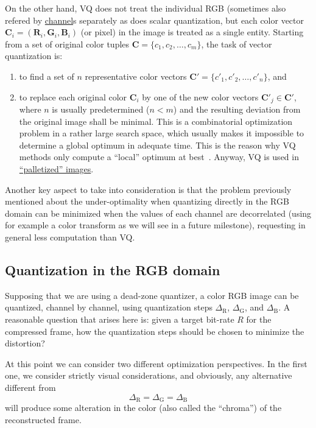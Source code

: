 On the other hand, VQ does not treat the individual RGB (sometimes
also refered by
\href{https://en.wikipedia.org/wiki/Color_image}{channel}s separately
as does scalar quantization, but each color vector
${\mathbf C}_i = ({\mathbf R}_i, {\mathbf G}_i, {\mathbf B}_i )$ (or
pixel) in the image is treated as a single entity. Starting from a set
of original color tuples ${\mathbf C} = \{c_1, c_2, \ldots ,c_m\}$,
the task of vector quantization is:
\begin{enumerate}
\item to ﬁnd a set of $n$ representative color vectors
  ${\mathbf C}' = \{c'_1, c'_2 ,\ldots , c'_n \}$, and
\item to replace each original color ${\mathbf C}_i$ by one of the new
  color vectors ${\mathbf C}'_j\in {\mathbf C}'$, where $n$ is usually
  predetermined ($n < m$) and the resulting deviation from the
  original image shall be minimal. This is a combinatorial
  optimization problem in a rather large search space, which usually
  makes it impossible to determine a global optimum in adequate
  time. This is the reason why VQ methods only compute a ``local''
  optimum at best~\cite{burger2016digital}. Anyway, VQ is used in
  \href{https://en.wikipedia.org/wiki/Palette_(computing)}{``palletized''
    images}.
\end{enumerate}

Another key aspect to take into consideration is that the problem
previously mentioned about the under-optimality when quantizing
directly in the RGB domain can be minimized when the values of each
channel are decorrelated (using for example a color transform as we
will see in a future milestone), requesting in general less
computation than VQ.


\subsection{Quantization in the RGB domain}

Supposing that we are using a dead-zone quantizer, a color RGB image
can be quantized, channel by channel, using quantization steps
$\Delta_{\text{R}}$, $\Delta_{\text{G}}$, and $\Delta_{\text{B}}$. A
reasonable question that arises here is: given a target bit-rate $R$
for the compressed frame, how the quantization steps should be chosen
to minimize the distortion?

At this point we can consider two different optimization
perspectives. In the first one, we consider strictly visual
considerations, and obviously, any alternative different from
\begin{equation}
  \Delta_{\text{R}} = \Delta_{\text{G}} = \Delta_{\text{B}}
  \label{eq:simple_Q}
\end{equation}
will produce some alteration in the color (also called the
``chroma'') of the reconstructed frame.

